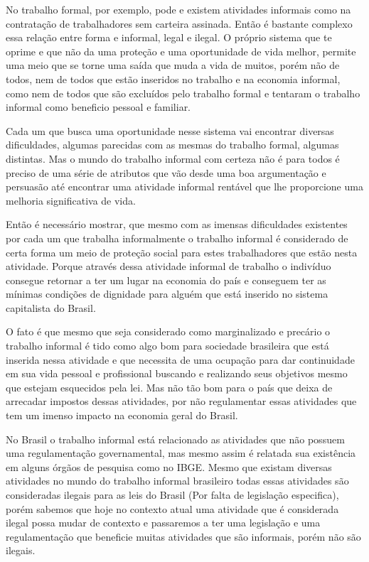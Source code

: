 No trabalho formal, por exemplo, pode e existem atividades informais como na contratação de trabalhadores sem carteira assinada. 
Então é bastante complexo essa relação entre forma e informal, legal e ilegal. O próprio sistema que te oprime e
que não da uma proteção e uma oportunidade de vida melhor, permite uma meio que se torne uma saída que muda a vida
de muitos, porém não de todos, nem de todos que estão inseridos no trabalho e na economia informal, como nem de 
todos que são excluídos pelo trabalho formal e tentaram o trabalho informal como beneficio pessoal e familiar. 

Cada um que busca uma oportunidade nesse sistema vai encontrar diversas dificuldades, algumas parecidas com as
mesmas do trabalho formal, algumas distintas. Mas o mundo do trabalho informal com certeza não é para todos é 
preciso de uma série de atributos que vão desde uma boa argumentação e persuasão até encontrar uma atividade 
informal rentável que lhe proporcione uma melhoria significativa de vida.

Então é necessário mostrar, que mesmo com as imensas dificuldades existentes por cada um que trabalha informalmente
o trabalho informal é considerado de certa forma um meio de proteção social para estes trabalhadores que estão
nesta atividade. Porque através dessa atividade informal de trabalho o indivíduo consegue retornar a ter um lugar
na economia do país e conseguem ter as mínimas condições de dignidade para alguém que está inserido no sistema 
capitalista do Brasil.

O fato é que mesmo que seja considerado como marginalizado e precário o trabalho informal é tido como algo bom 
para sociedade brasileira que está inserida nessa atividade e que necessita de uma ocupação para dar continuidade
em sua vida pessoal e profissional buscando e realizando seus objetivos mesmo que estejam esquecidos pela lei.
Mas não tão bom para o país que deixa de arrecadar impostos dessas atividades, por não regulamentar essas 
atividades que tem um imenso impacto na economia geral do Brasil.

No Brasil o trabalho informal está relacionado as atividades que não possuem uma regulamentação governamental, 
mas mesmo assim é relatada sua existência em alguns órgãos de pesquisa como no IBGE. Mesmo que existam diversas 
atividades no mundo do trabalho informal brasileiro todas essas atividades são consideradas ilegais para as leis 
do Brasil (Por falta de legislação especifica), porém sabemos que hoje no contexto atual uma atividade que é 
considerada ilegal possa mudar de contexto e passaremos a ter uma legislação e uma regulamentação que beneficie 
muitas atividades que são informais, porém não são ilegais. 

